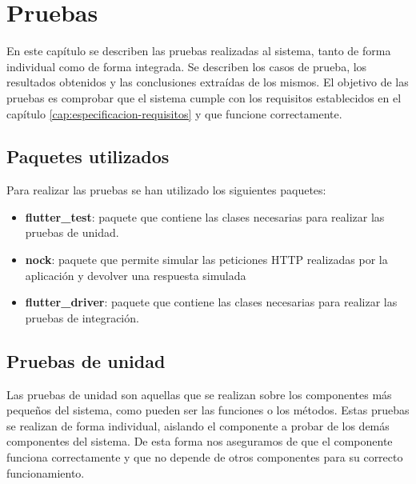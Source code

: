 \chapter{Pruebas}
\label{cap:pruebas}
En este capítulo se describen las pruebas realizadas al sistema, tanto de forma individual como de forma integrada. Se describen los casos de prueba, los resultados obtenidos y las conclusiones extraídas de los mismos.
El objetivo de las pruebas es comprobar que el sistema cumple con los requisitos establecidos en el capítulo \ref{cap:especificacion-requisitos} y que funcione correctamente.

\section{Paquetes utilizados}
\label{sec:paquetes-utilizados}
Para realizar las pruebas se han utilizado los siguientes paquetes:

\begin{itemize}
    \item \textbf{flutter\_test}: paquete que contiene las clases necesarias para realizar las pruebas de unidad.
    \item \textbf{nock}: paquete que permite simular las peticiones HTTP realizadas por la aplicación y devolver una respuesta simulada
    \item \textbf{flutter\_driver}: paquete que contiene las clases necesarias para realizar las pruebas de integración. 
\end{itemize}


\section{Pruebas de unidad}
\label{sec:pruebas-unidad}
Las pruebas de unidad son aquellas que se realizan sobre los componentes más pequeños del sistema, como pueden ser las funciones o los métodos. Estas pruebas se realizan de forma individual, aislando el componente a probar de los demás componentes del sistema. 
De esta forma nos aseguramos de que el componente funciona correctamente y que no depende de otros componentes para su correcto funcionamiento.
\newpage



